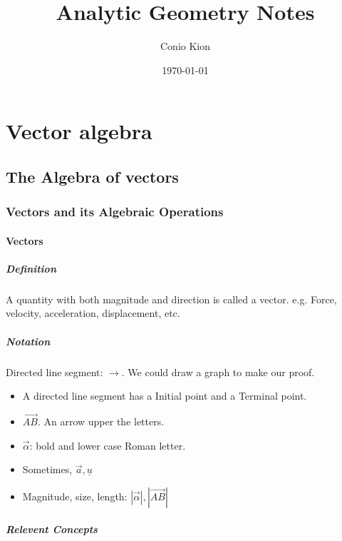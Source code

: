 \documentclass[11pt]{book}
\title{Analytic Geometry Notes}
\author{Conio Kion}
\date{\today}
\begin{document}
	
\maketitle
\chapter{Vector algebra}
\section{The Algebra of vectors}

\subsection{Vectors and its Algebraic Operations }

\subsubsection{Vectors}
\paragraph{Definition}
A quantity with both magnitude and direction is called a vector. e.g. Force, velocity, acceleration, displacement, etc.

\paragraph{Notation}
Directed line segment: $\rightarrow $. We could draw a graph to make our proof.


\begin{itemize}

\item A directed line segment has a Initial point and a Terminal point.  

\item $\overrightarrow{AB}$. An arrow upper the letters. 

\item $\vec \alpha$: bold and lower case Roman letter.  

\item Sometimes, $\vec a,\underline u$ 

\item Magnitude, size, length: $|\vec \alpha|,|\overrightarrow {AB}|$


\end{itemize}

\paragraph{Relevent Concepts} 
\end{document}
